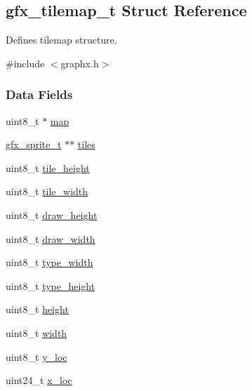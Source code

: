 \hypertarget{structgfx__tilemap__t}{}\subsection{gfx\+\_\+tilemap\+\_\+t Struct Reference}
\label{structgfx__tilemap__t}


Defines tilemap structure.  




{\ttfamily \#include $<$graphx.\+h$>$}

\subsubsection*{Data Fields}
\begin{DoxyCompactItemize}
\item 
uint8\+\_\+t $\ast$ \hyperlink{structgfx__tilemap__t_ad26ea69a922121a4c93f995dcb5149fb}{map}
\item 
\hyperlink{structgfx__sprite__t}{gfx\+\_\+sprite\+\_\+t} $\ast$$\ast$ \hyperlink{structgfx__tilemap__t_a164f38a386c700b0537fb119dc4eca7c}{tiles}
\item 
uint8\+\_\+t \hyperlink{structgfx__tilemap__t_ae1b88df485af33051d48558c3010b805}{tile\+\_\+height}
\item 
uint8\+\_\+t \hyperlink{structgfx__tilemap__t_a2c40cc816fcf0f691eac1041d848f5f2}{tile\+\_\+width}
\item 
uint8\+\_\+t \hyperlink{structgfx__tilemap__t_a5dd664c5691e669782e067cbe6ba0ad8}{draw\+\_\+height}
\item 
uint8\+\_\+t \hyperlink{structgfx__tilemap__t_a15929def589462587871049ab6ce4e98}{draw\+\_\+width}
\item 
uint8\+\_\+t \hyperlink{structgfx__tilemap__t_a71ae1e272a832df252d801026f923578}{type\+\_\+width}
\item 
uint8\+\_\+t \hyperlink{structgfx__tilemap__t_a18dbcf332a669525cac3856ded67aee2}{type\+\_\+height}
\item 
uint8\+\_\+t \hyperlink{structgfx__tilemap__t_aa69f824ad3ff8665a4d4fc0f47c239a9}{height}
\item 
uint8\+\_\+t \hyperlink{structgfx__tilemap__t_aeb063354c54e6fdc4fb513ae6e68e9b7}{width}
\item 
uint8\+\_\+t \hyperlink{structgfx__tilemap__t_a136405fb3ced986880fbc44a8484e27b}{y\+\_\+loc}
\item 
uint24\+\_\+t \hyperlink{structgfx__tilemap__t_acdbd1f0b2e04b502311c507dbe7c894a}{x\+\_\+loc}
\end{DoxyCompactItemize}


